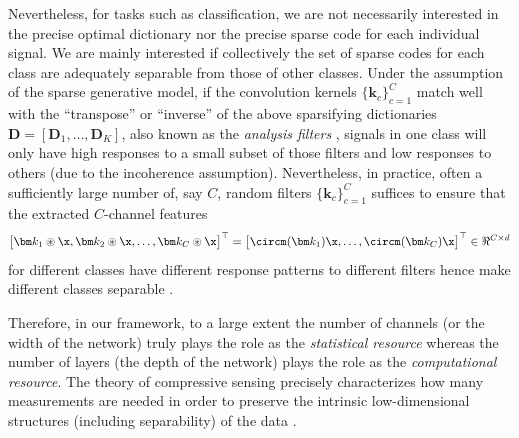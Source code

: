 \documentclass[../../book-main.tex]{subfiles}
\begin{document}
Nevertheless, for tasks such as classification, we are not necessarily interested in the precise optimal dictionary nor the precise sparse code for each individual signal. We are mainly interested if collectively the set of sparse codes for each class are adequately separable from those of other classes. Under the assumption of the sparse generative model, if the convolution kernels $\{\bm k_c\}_{c=1}^C$  match well with the ``transpose'' or ``inverse'' of the above sparsifying dictionaries $\bm D = [\bm D_1, \ldots, \bm D_K]$, also known as the {\em analysis filters} \cite{Cosparse-Nam,Analysis-Filter}, signals in one class will only have high responses to a small subset of those filters and low responses to others (due to the incoherence assumption).  Nevertheless, in practice, often a sufficiently large number of, say $C$, random filters $\{\bm k_c\}_{c=1}^C$ suffices to ensure that the extracted $C$-channel features
\begin{equation}
\big[\bm k_1 \circledast \x, \bm k_2 \circledast \x, \ldots, \bm k_C \circledast \x\big]^\top = \big[\circm(\bm k_1) \x, \ldots, \circm(\bm k_C) \x \big]^\top \in \Re^{C\times d}
\end{equation}
for different classes have different response patterns to different filters hence make different classes separable \cite{chan2015pcanet}. 

Therefore, in our framework, to a large extent the number of channels (or the width of the network) truly plays the role as the  {\em statistical resource} whereas the number of layers (the depth of the network) plays the role as the {\em computational resource}. The theory of compressive sensing precisely characterizes how many measurements are needed in order to preserve the intrinsic low-dimensional structures (including separability) of the data \cite{Wright-Ma-2021}. %
\end{document}
